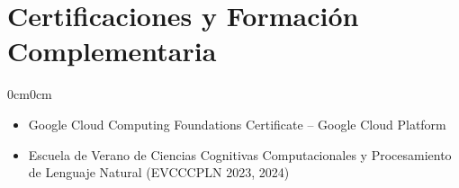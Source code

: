 \documentclass[10pt, letterpaper]{article}
\newenvironment{highlights}{
	\begin{itemize}[topsep=0.15cm,itemsep=0pt,leftmargin=10pt]
	}{
	\end{itemize}
}
\newenvironment{onecolentry}{
	\begin{adjustwidth}{0cm}{0cm}
	}{
	\end{adjustwidth}
	\vspace{0.02cm}
}
\begin{document}
	\section{Certificaciones y Formación Complementaria}
	
	\begin{onecolentry}
		\begin{highlights}
			\item Google Cloud Computing Foundations Certificate – Google Cloud Platform
			\item Escuela de Verano de Ciencias Cognitivas Computacionales y Procesamiento de Lenguaje Natural (EVCCCPLN 2023, 2024)
		\end{highlights}
	\end{onecolentry}
	
\end{document}
